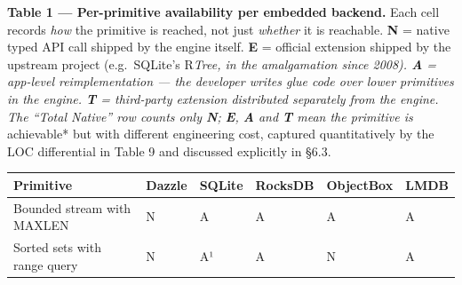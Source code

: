 \textbf{Table 1 --- Per-primitive availability per embedded backend.} Each cell
records \emph{how} the primitive is reached, not just \emph{whether} it is
reachable. \textbf{N} = native typed API call shipped by the engine itself.
\textbf{E} = official extension shipped by the upstream project (e.g.~SQLite's
R\emph{Tree, in the amalgamation since 2008). \textbf{A} = app-level
reimplementation --- the developer writes glue code over lower primitives in the
engine. \textbf{T} = third-party extension distributed separately from the
engine. The ``Total Native'' row counts only \textbf{N}; \textbf{E}, \textbf{A}
and \textbf{T} mean the primitive is }achievable* but with different engineering
cost, captured quantitatively by the LOC differential in Table 9 and discussed
explicitly in §6.3.

{\def\LTcaptype{none} %
\begin{longtable}[]{@{}
  >{\raggedright\arraybackslash}p{}
  >{\centering\arraybackslash}p{}
  >{\centering\arraybackslash}p{}
  >{\centering\arraybackslash}p{}
  >{\centering\arraybackslash}p{}
  >{\centering\arraybackslash}p{}@{}}
\toprule\noalign{}
\begin{minipage}[b]{\linewidth}\raggedright
Primitive
\end{minipage} & \begin{minipage}[b]{\linewidth}\centering
Dazzle
\end{minipage} & \begin{minipage}[b]{\linewidth}\centering
SQLite
\end{minipage} & \begin{minipage}[b]{\linewidth}\centering
RocksDB
\end{minipage} & \begin{minipage}[b]{\linewidth}\centering
ObjectBox
\end{minipage} & \begin{minipage}[b]{\linewidth}\centering
LMDB
\end{minipage} \\
\midrule\noalign{}
\endhead
\bottomrule\noalign{}
\endlastfoot
Bounded stream with MAXLEN & N & A & A & A & A \\
Sorted sets with range query & N & A¹ & A & N & A \\

\end{longtable}}

